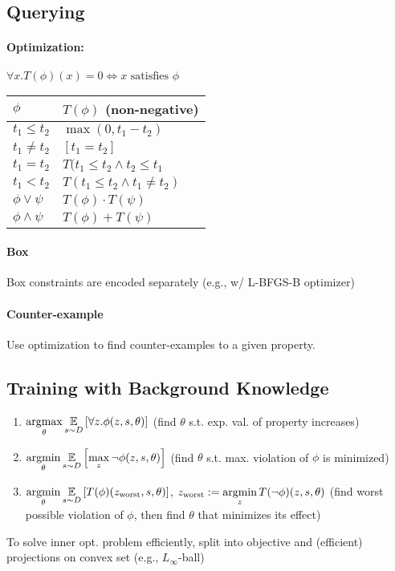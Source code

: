 \subsection*{Querying}
\paragraph{Optimization:} $\forall x. T(\phi)(x) = 0 \Leftrightarrow x \text{ satisfies } \phi$

\centering
\begin{tabular}{ll}
$\phi$ & $T(\phi)$ (non-negative) \\\hline
$t_1 \le t_2$ & $\max(0, t_1-t_2)$ \\
$t_1 \neq t_2$ & $[t_1 = t_2]$ \\
$t_1 = t_2$ & $T(t_1 \le t_2 \land t_2 \le t_1$ \\
$t_1 < t_2$ & $T(t_1 \le t_2 \land t_1 \neq t_2)$ \\
$\phi \lor \psi$ & $T(\phi) \cdot T(\psi)$ \\
$\phi \land \psi$ & $T(\phi) + T(\psi)$
\end{tabular}

\raggedright
\paragraph{Box} Box constraints are encoded separately (e.g., w/ L-BFGS-B optimizer)

\paragraph{Counter-example} Use optimization to find counter-examples to a given property. 

\subsection*{Training with Background Knowledge}
\begin{enumerate}
\item $\displaystyle \operatorname*{argmax}_\theta \operatorname*{\mathbb{E}}_{s \sim D} \left[ \forall z. \phi(z, s, \theta) \right]$ (find $\theta$ s.t. exp. val. of property increases)

\item $\displaystyle \operatorname*{argmin}_\theta \operatorname*{\mathbb{E}}_{s \sim D} \left[ \max_z \lnot \phi(z, s, \theta) \right]$ (find $\theta$ s.t. max. violation of $\phi$ is minimized)

\item $\displaystyle \operatorname*{argmin}_\theta \operatorname*{\mathbb{E}}_{s \sim D} \left[ T(\phi)(z_\text{worst}, s, \theta) \right]$,
$\displaystyle z_\text{worst} := \operatorname*{argmin}_z T(\lnot \phi)(z, s, \theta)$ (find worst possible violation of $\phi$, then find $\theta$ that minimizes its effect)
\end{enumerate}

To solve inner opt. problem efficiently, split into objective and (efficient) projections on convex set (e.g., $L_\infty$-ball)
